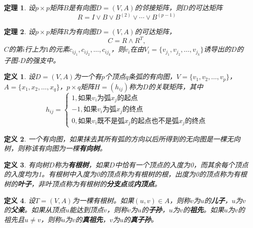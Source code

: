 \documentclass{article}
\newtheorem{Def}{定义}
\newtheorem{Thm}{定理}
\begin{document}
\begin{CJK*}{UTF8}{gbsn}
    \begin{Thm}
    设$p \times p$矩阵$B$是有向图$D=(V,A)$的邻接矩阵，则$D$的可达矩阵
    \[R = I \lor B \lor B^{(2)} \lor \cdots \lor B^{(p-1)}\]
  \end{Thm}
  \begin{Thm}
   设$p \times p$矩阵$R$为有向图$D=(V,A)$的可达矩阵， \[C=R \land R^T,\] $C$的第$i$行上为$1$的元素$c_{ij_1}, c_{ij_2}, \ldots, c_{ij_k}$，则$v_i$在由$V_i= \{v_{j_1}, v_{j_2}, \ldots, v_{j_k}\}$诱导出的$D$的子图-$D$的强支中。
 \end{Thm}
  \centering
 \begin{Def}
   设$D=(V,A)$为一个有$p$个顶点$q$条弧的有向图，$V=\{v_1,v_2,\ldots, v_p\}$，$A=\{x_1,x_2,\ldots,x_q\}$，$p\times q$矩阵$H=(h_{ij})$称为$D$的关联矩阵，其中
  \[h_{ij}=\begin{cases}
      1, \text{如果}v_i\text{为弧}x_j\text{的起点}\\
      -1, \text{如果}v_i\text{为弧}x_j\text{的终点}\\
      0, \text{如果}v_i\text{既不是弧}x_j\text{的起点也不是弧}x_j\text{的终点}
    \end{cases}
  \]
 \end{Def}

   \begin{Def}
    一个有向图，如果抹去其所有弧的方向以后所得到的无向图是一棵无向树，则称该有向图为一棵{\bfseries 有向树}。
  \end{Def}

    \begin{Def}
    有向树$D$称为{\bfseries 有根树}，如果$D$中恰有一个顶点的入度为0，而其余每个顶点的入度均为1。有根树中入度为0的顶点称为有根树的根，出度为0的顶点称为有根树的{\bfseries 叶子}，非叶顶点称为有根树的{\bfseries 分支点}或{\bfseries 内顶点}。
  \end{Def}

    \begin{Def}
  设$T=(V,A)$为一棵有根树。如果$(u,v)\in A$，则称$v$为$u$的{\bfseries 儿子}，$u$为$v$的{\bfseries 父亲}。如果从顶点$u$能达到顶点$v$，则称$v$为$u$的{\bfseries 子孙}，$u$为$v$的{\bfseries 祖先}。如果$u$为$v$的祖先且$u \neq v$，则称$u$为$v$的{\bfseries 真祖先}，$v$为$u$的{\bfseries 真子孙}。
  \end{Def}


\end{CJK*}
\end{document}
